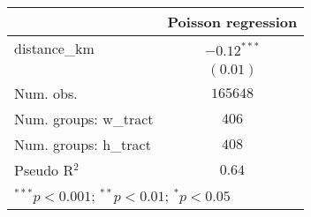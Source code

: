 
\begin{tabular}{l c}
\hline
 & Poisson regression \\
\hline
distance\_km          & $-0.12^{***}$ \\
                      & $(0.01)$      \\
\hline
Num. obs.             & $165648$      \\
Num. groups: w\_tract & $406$         \\
Num. groups: h\_tract & $408$         \\
Pseudo R$^2$          & $0.64$        \\
\hline
\multicolumn{2}{l}{\scriptsize{$^{***}p<0.001$; $^{**}p<0.01$; $^{*}p<0.05$}}
\end{tabular}
